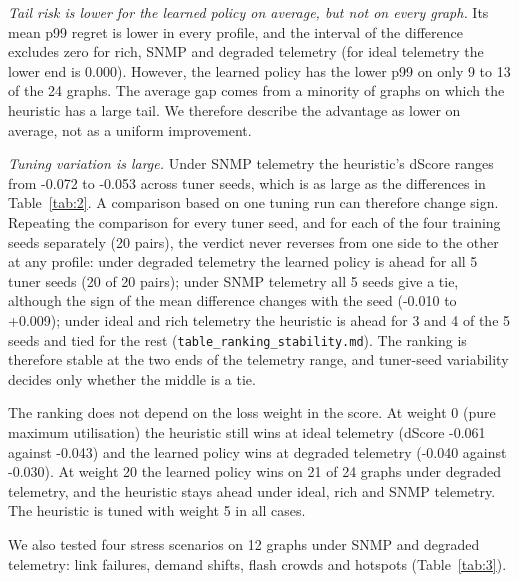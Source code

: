 \documentclass[journal]{IEEEtran}
\begin{document}
\textit{Tail risk is lower for the learned policy on average, but not on every graph.} Its mean p99 regret is lower in every profile, and the interval of the difference excludes zero for rich, SNMP and degraded telemetry (for ideal telemetry the lower end is 0.000). However, the learned policy has the lower p99 on only 9 to 13 of the 24 graphs. The average gap comes from a minority of graphs on which the heuristic has a large tail. We therefore describe the advantage as lower on average, not as a uniform improvement.

\textit{Tuning variation is large.} Under SNMP telemetry the heuristic's dScore ranges from -0.072 to -0.053 across tuner seeds, which is as large as the differences in Table~\ref{tab:2}. A comparison based on one tuning run can therefore change sign. Repeating the comparison for every tuner seed, and for each of the four training seeds separately (20 pairs), the verdict never reverses from one side to the other at any profile: under degraded telemetry the learned policy is ahead for all 5 tuner seeds (20 of 20 pairs); under SNMP telemetry all 5 seeds give a tie, although the sign of the mean difference changes with the seed (-0.010 to +0.009); under ideal and rich telemetry the heuristic is ahead for 3 and 4 of the 5 seeds and tied for the rest (\texttt{table\_ranking\_stability.md}). The ranking is therefore stable at the two ends of the telemetry range, and tuner-seed variability decides only whether the middle is a tie.

The ranking does not depend on the loss weight in the score. At weight 0 (pure maximum utilisation) the heuristic still wins at ideal telemetry (dScore -0.061 against -0.043) and the learned policy wins at degraded telemetry (-0.040 against -0.030). At weight 20 the learned policy wins on 21 of 24 graphs under degraded telemetry, and the heuristic stays ahead under ideal, rich and SNMP telemetry. The heuristic is tuned with weight 5 in all cases.

We also tested four stress scenarios on 12 graphs under SNMP and degraded telemetry: link failures, demand shifts, flash crowds and hotspots (Table~\ref{tab:3}).
\end{document}

